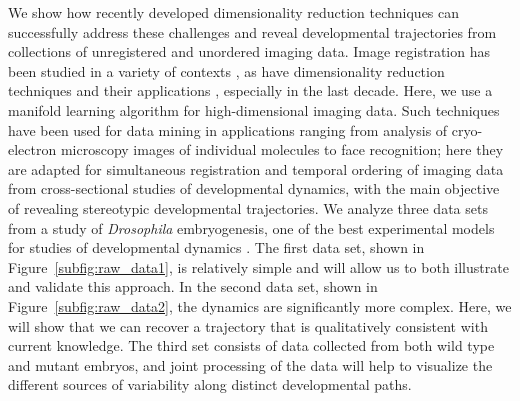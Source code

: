 \documentclass{pnastwo}
\begin{document}
\begin{article}
We show how recently developed dimensionality reduction techniques can successfully address these challenges and reveal developmental trajectories from collections of unregistered and unordered imaging data.
%
Image registration has been studied in a variety of contexts \cite{zitova2003image, rowley1998rotation, hajnal2010medical, greenspan1994rotation, zhao2003face}, as have dimensionality reduction techniques \cite{Belkin2003, coifman2005geometric, coifman2006geometric, tenenbaum2000global, roweis2000nonlinear} and their applications \cite{anavy2014blind, trapnell2014dynamics,gupta2008extracting, qiu2011discovering, kafri2013dynamics}, especially in the last decade. 
%
Here, we use a manifold learning algorithm \cite{singer2012vector} for high-dimensional imaging data. %
%
Such techniques have been used for data mining in
applications ranging from analysis of cryo-electron microscopy images of individual molecules to face recognition; here they are adapted
for simultaneous registration and temporal ordering of imaging data from cross-sectional studies of developmental dynamics, with the main objective of revealing stereotypic developmental trajectories.
%
We analyze three data sets from a study of {\it Drosophila} embryogenesis, one of the best experimental models for studies of developmental dynamics \cite{jaeger2012drosophila}.
%
The first data set, shown in Figure~\ref{subfig:raw_data1}, is relatively simple and will allow us to both illustrate and validate this approach.
%
In the second data set, shown in Figure~\ref{subfig:raw_data2}, the dynamics are significantly more complex.
%
Here, we will show that we can recover a trajectory that is qualitatively consistent with current knowledge.
%
The third set consists of data collected from both wild type and mutant embryos, and joint processing of the data will help to visualize the different sources of variability along distinct developmental paths.

%
%
%
%



\end{article}
\end{document}

